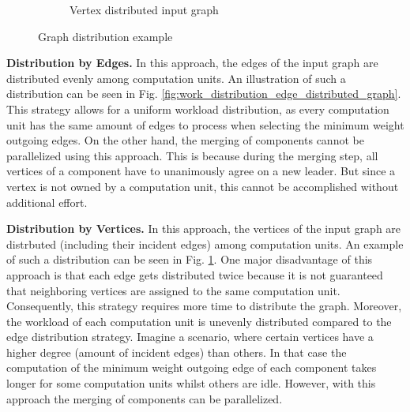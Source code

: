\documentclass[letterpaper]{article}
\newcommand{\mypar}[1]{{\bf #1.}}
\begin{document}
\begin{figure}
\begin{subfigure}{0.33\textwidth}
    \caption{Vertex distributed input graph}
    \label{fig:work_distribution_vertex_distributed_graph}
  \end{subfigure}
  \caption{Graph distribution example}
  \label{fig:work_distribution}
\end{figure}

\mypar{Distribution by Edges}
In this approach, the edges of the input graph are distributed evenly among computation units. An illustration of such a
distribution can be seen in Fig. \ref{fig:work_distribution_edge_distributed_graph}. This strategy allows for a uniform
workload distribution, as every computation unit has the same amount of edges to process when selecting the minimum
weight outgoing edges. On the other hand, the merging of components cannot be parallelized using this approach. This is
because during the merging step, all vertices of a component have to unanimously agree on a new leader. But since a
vertex is not owned by a computation unit, this cannot be accomplished without additional effort.

\mypar{Distribution by Vertices}
In this approach, the vertices of the input graph are distrbuted (including their incident edges) among computation
units. An example of such a distribution can be seen in Fig. \ref{fig:work_distribution_vertex_distributed_graph}. One
major disadvantage of this approach is that each edge gets distributed twice because it is not guaranteed that
neighboring vertices are assigned to the same computation unit. Consequently, this strategy requires more time to
distribute the graph. Moreover, the workload of each computation unit is unevenly distributed compared to the edge
distribution strategy. Imagine a scenario, where certain vertices have a higher degree (amount of incident edges) than
others. In that case the computation of the minimum weight outgoing edge of each component takes longer for some
computation units whilst others are idle. However, with this approach the merging of components can be parallelized. 
\end{document}
